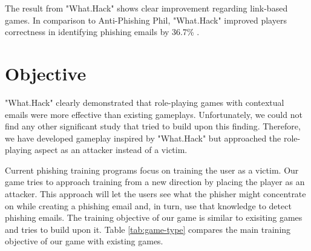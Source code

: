 The result from "What.Hack" shows clear improvement regarding link-based games. In comparison to Anti-Phishing Phil, "What.Hack" improved players correctness in identifying phishing emails by 36.7\% \cite{what_hack}.

\section{Objective}

"What.Hack" clearly demonstrated that role-playing games with contextual emails were more effective than existing gameplays. Unfortunately, we could not find any other significant study that tried to build upon this finding. Therefore, we have developed gameplay inspired by "What.Hack" but approached the role-playing aspect as an attacker instead of a victim.

Current phishing training programs focus on training the user as a victim. Our game tries to approach training from a new direction by placing the player as an attacker. This approach will let the users see what the phisher might concentrate on while creating a phishing email and, in turn, use that knowledge to detect phishing emails. The training objective of our game is similar to exisiting games and tries to build upon it. Table \ref{tab:game-type} compares the main training objective of our game with existing games.

\begin{table}[!ht]
    \caption{Different type of training games and their main objectives}
    \label{tab:game-type}
\end{table}

